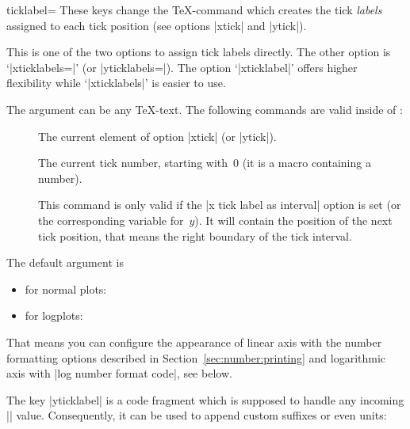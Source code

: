 \begin{pgfplotsxykey}{\x ticklabel=}
These keys change the \TeX-command which creates the tick \emph{labels} assigned to each tick position (see options |xtick| and |ytick|). 

This is one of the two options to assign tick labels directly. The other option is `|xticklabels=|' (or |yticklabels=|). The option `|xticklabel|' offers higher flexibility while `|xticklabels|' is easier to use.

The argument  can be any \TeX-text. The following commands are valid inside of :
\begin{description}
	\item[] \declareandlabel{\tick} The current element of option |xtick| (or |ytick|).
	\item[] \declareandlabel{\ticknum} The current tick number, starting with~0 (it is a macro containing a number).
	\item[] \declareandlabel{\nexttick} This command is only valid if the |x tick label as interval| option is set (or the corresponding variable for~$y$). It will contain the position of the next tick position, that means the right boundary of the tick interval.
\end{description}
The default argument is 
\begin{itemize}
	\item \declareandlabel{\axisdefaultticklabel} for normal plots:
\begin{codeexample}
\def\axisdefaultticklabel{$\pgfmathprintnumber{\tick}$}
\end{codeexample}

	\item \declareandlabel{\axisdefaultticklabellog} for logplots:
\begin{codeexample}
\def\axisdefaultticklabellog{%
	\pgfkeysgetvalue{/pgfplots/log number format code/.@cmd}\pgfplots@log@label@style
	\expandafter\pgfplots@log@label@style\tick\pgfeov
}
\end{codeexample}
\end{itemize}
That means you can configure the appearance of linear axis with the number formatting options described in Section~\ref{sec:number:printing} and logarithmic axis with |log number format code|, see below.


\noindent The key |yticklabel| is a code fragment which is supposed to handle any incoming |\tick| value. Consequently, it can be used to append custom suffixes or even units:
\begin{codeexample}[]
\end{codeexample}


\end{pgfplotsxykey}
